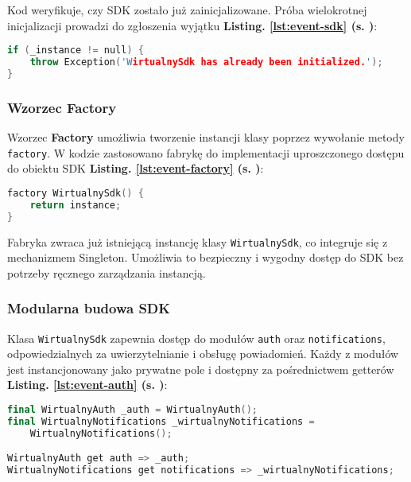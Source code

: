 Kod weryfikuje, czy SDK zostało już zainicjalizowane. Próba wielokrotnej inicjalizacji prowadzi do zgłoszenia wyjątku \textbf{Listing. \ref{lst:event-sdk} (s. \pageref{lst:event-sdk})}:

\begin{lstlisting}[language=C++, caption=Zgłoszenie wyjątku,  label={lst:event-sdk}]
if (_instance != null) {
    throw Exception('WirtualnySdk has already been initialized.');
}
\end{lstlisting}

\subsubsection{Wzorzec Factory}
Wzorzec \textbf{Factory} umożliwia tworzenie instancji klasy poprzez wywołanie metody \texttt{factory}. W kodzie zastosowano fabrykę do implementacji uproszczonego dostępu do obiektu SDK \textbf{Listing. \ref{lst:event-factory} (s. \pageref{lst:event-factory})}:

\begin{lstlisting}[language=C++, caption=Wzorzec Factory,  label={lst:event-factory}]
factory WirtualnySdk() {
    return instance;
}
\end{lstlisting}

Fabryka zwraca już istniejącą instancję klasy \texttt{WirtualnySdk}, co integruje się z mechanizmem Singleton. Umożliwia to bezpieczny i wygodny dostęp do SDK bez potrzeby ręcznego zarządzania instancją.

\subsubsection{Modularna budowa SDK}
Klasa \texttt{WirtualnySdk} zapewnia dostęp do modułów \texttt{auth} oraz \texttt{notifications}, odpowiedzialnych za uwierzytelnianie i obsługę powiadomień. Każdy z modułów jest instancjonowany jako prywatne pole i dostępny za pośrednictwem getterów \textbf{Listing. \ref{lst:event-auth} (s. \pageref{lst:event-auth})}:

\begin{lstlisting}[language=C++, caption=WirtualnyAuth,  label={lst:event-auth}]
final WirtualnyAuth _auth = WirtualnyAuth();
final WirtualnyNotifications _wirtualnyNotifications =
    WirtualnyNotifications();

WirtualnyAuth get auth => _auth;
WirtualnyNotifications get notifications => _wirtualnyNotifications;
\end{lstlisting}

